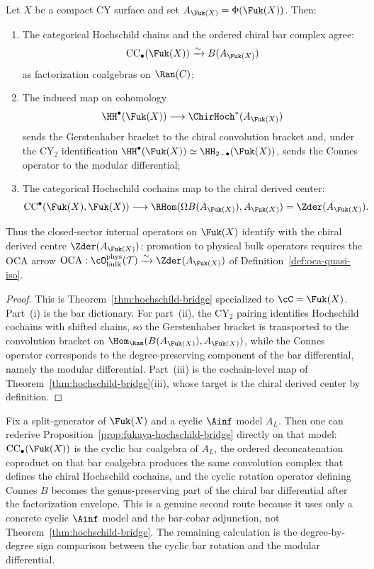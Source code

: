 \begin{proposition}
\label{prop:fukaya-hochschild-bridge}
Let $X$ be a compact CY surface and set
$A_{\Fuk(X)} = \Phi(\Fuk(X))$. Then:
\begin{enumerate}[label=(\roman*)]
 \item The categorical Hochschild chains and the ordered chiral bar
 complex agree:
 \[
 \mathrm{CC}_\bullet(\Fuk(X))
 \xrightarrow{\sim}
 B(A_{\Fuk(X)})
 \]
 as factorization coalgebras on $\Ran(C)$;
 \item The induced map on cohomology
 \[
 \HH^\bullet(\Fuk(X)) \longrightarrow \ChirHoch^*(A_{\Fuk(X)})
 \]
 sends the Gerstenhaber bracket to the chiral convolution bracket
 and, under the CY$_2$ identification
 $\HH^\bullet(\Fuk(X)) \simeq \HH_{2-\bullet}(\Fuk(X))$, sends the
 Connes operator to the modular differential;
 \item The categorical Hochschild cochains map to the chiral derived
 center:
 \[
 \mathrm{CC}^\bullet(\Fuk(X), \Fuk(X))
 \longrightarrow
 \RHom(\Omega B(A_{\Fuk(X)}), A_{\Fuk(X)})
 = \Zder(A_{\Fuk(X)}).
 \]
\end{enumerate}
Thus the closed-sector internal operators on $\Fuk(X)$ identify
with the chiral derived centre $\Zder(A_{\Fuk(X)})$; promotion to
physical bulk operators requires the OCA arrow
$\mathrm{OCA}: \cO^{\mathrm{phys}}_{\mathrm{bulk}}(\mathcal T) \xrightarrow{\sim} \Zder(A_{\Fuk(X)})$
of Definition~\ref{def:oca-quasi-iso}.
\end{proposition}

\begin{proof}
This is Theorem~\ref{thm:hochschild-bridge} specialized to
$\cC = \Fuk(X)$. Part~(i) is the bar dictionary. For part~(ii), the
CY$_2$ pairing identifies Hochschild cochains with shifted chains, so
the Gerstenhaber bracket is transported to the convolution bracket on
$\Hom_{\Ran}(B(A_{\Fuk(X)}), A_{\Fuk(X)})$, while the Connes operator
corresponds to the degree-preserving component of the bar
differential, namely the modular differential. Part~(iii) is the
cochain-level map of Theorem~\ref{thm:hochschild-bridge}(iii), whose
target is the chiral derived center by definition.
\end{proof}

\begin{remark}
\label{rem:fukaya-hochschild-bridge-secondary}
Fix a split-generator of $\Fuk(X)$ and a cyclic $\Ainf$ model $A_L$.
Then one can rederive Proposition~\ref{prop:fukaya-hochschild-bridge}
directly on that model: $\mathrm{CC}_\bullet(\Fuk(X))$ is the cyclic
bar coalgebra of $A_L$, the ordered deconcatenation coproduct on that
bar coalgebra produces the same convolution complex that defines the
chiral Hochschild cochains, and the cyclic rotation operator defining
Connes $B$ becomes the genus-preserving part of the chiral bar
differential after the factorization envelope. This is a genuine
second route because it uses only a concrete cyclic $\Ainf$ model and
the bar-cobar adjunction, not Theorem~\ref{thm:hochschild-bridge}.
The remaining calculation is the degree-by-degree sign comparison
between the cyclic bar rotation and the modular differential.
\end{remark}

